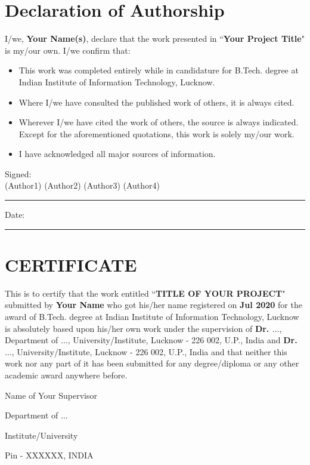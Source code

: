 \thispagestyle{empty}

\setcounter{page}{3}

\chapter*{Declaration of Authorship}

\vspace{1cm}

\noindent 
I/we, \textbf{Your Name(s)}, declare that the work presented in ``\textbf{Your Project Title}" is my/our own. I/we confirm that:

\medskip

\begin{itemize} 
    \item This work was completed entirely while in candidature for B.Tech. degree at Indian Institute of Information Technology, Lucknow.
    
    \medskip
    
    \item Where I/we have consulted the published work of others, it is always cited.
    
    \medskip
    
    \item Wherever I/we have cited the work of others, the source is always indicated. Except for the aforementioned quotations, this work is solely my/our work.
    
    \medskip
    
    \item I have acknowledged all major sources of information.
\end{itemize}

\vspace{2cm}

\noindent Signed:\\

\hspace{1.5cm}(Author1) \hfill (Author2) \hfill (Author3) \hfill (Author4)
\rule[0.5em]{33em}{0.5pt} 
 
\noindent Date:\\
\rule[0.5em]{33em}{0.5pt}

\cleardoublepage

\chapter*{CERTIFICATE}

This is to certify that the work entitled ``\textbf{TITLE OF YOUR PROJECT}" submitted by \textbf{Your Name} who got his/her name registered on \textbf{\;\;\; Jul 2020} for the award of B.Tech. degree at Indian Institute of Information Technology, Lucknow is absolutely based upon his/her own work under the supervision of \textbf{Dr. $\dots$}, Department of $\dots$, University/Institute, Lucknow - 226 002, U.P., India and \textbf{Dr. $\dots$}, University/Institute, Lucknow - 226 002, U.P., India and that neither this work nor any part of it has been submitted for any degree/diploma or any other academic award anywhere before.  

\vspace{4cm}

\begin{center}
    Name of Your Supervisor

    Department of $\dots$ 

    Institute/University 

    Pin - XXXXXX, INDIA 
\end{center}
